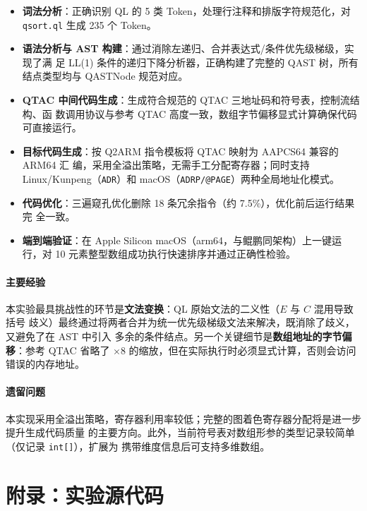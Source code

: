 \documentclass[12pt,a4paper]{ctexart}
\begin{document}
\begin{itemize}
  \item \textbf{词法分析}：正确识别 QL 的 5 类 Token，处理行注释和排版字符规范化，对
        \texttt{qsort.ql} 生成 235 个 Token。
  \item \textbf{语法分析与 AST 构建}：通过消除左递归、合并表达式/条件优先级梯级，实现了满
        足 LL(1) 条件的递归下降分析器，正确构建了完整的 QAST 树，所有结点类型均与 QASTNode
        规范对应。
  \item \textbf{QTAC 中间代码生成}：生成符合规范的 QTAC 三地址码和符号表，控制流结构、函
        数调用协议与参考 QTAC 高度一致，数组字节偏移显式计算确保代码可直接运行。
  \item \textbf{目标代码生成}：按 Q2ARM 指令模板将 QTAC 映射为 AAPCS64 兼容的 ARM64 汇
        编，采用全溢出策略，无需手工分配寄存器；同时支持 Linux/Kunpeng（\texttt{ADR}）和
        macOS（\texttt{ADRP/@PAGE}）两种全局地址化模式。
  \item \textbf{代码优化}：三遍窥孔优化删除 18 条冗余指令（约 7.5\%），优化前后运行结果完
        全一致。
  \item \textbf{端到端验证}：在 Apple Silicon macOS（arm64，与鲲鹏同架构）上一键运行，对
        10 元素整型数组成功执行快速排序并通过正确性检验。
\end{itemize}

\paragraph{主要经验}

本实验最具挑战性的环节是\textbf{文法变换}：QL 原始文法的二义性（$E$ 与 $C$ 混用导致括号
歧义）最终通过将两者合并为统一优先级梯级文法来解决，既消除了歧义，又避免了在 AST 中引入
多余的条件结点。另一个关键细节是\textbf{数组地址的字节偏移}：参考 QTAC 省略了 $\times 8$
的缩放，但在实际执行时必须显式计算，否则会访问错误的内存地址。

\paragraph{遗留问题}

本实现采用全溢出策略，寄存器利用率较低；完整的图着色寄存器分配将是进一步提升生成代码质量
的主要方向。此外，当前符号表对数组形参的类型记录较简单（仅记录 \texttt{int[]}），扩展为
携带维度信息后可支持多维数组。

\section*{附录：实验源代码}
\end{document}
